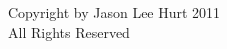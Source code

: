\newpage
\vspace*{\fill}
\begin{center}
Copyright by Jason Lee Hurt 2011\\
All Rights Reserved
\end{center}
\vspace*{\fill}

